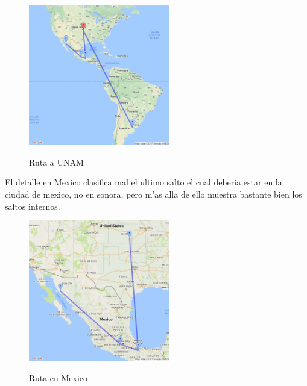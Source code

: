 \begin{figure}[H]
\centering
\caption{Ruta a UNAM}
\includegraphics[width=0.55\textwidth]{modules/unam_path_1}
 \label{fig:ruta_unam_1}
\end{figure}

El detalle en Mexico clasifica mal el ultimo salto el cual deberia estar en la ciudad de mexico, no en sonora, pero m'as alla de ello muestra bastante bien los saltos internos.
\begin{figure}[H]
\centering
\caption{Ruta en Mexico}
\includegraphics[width=0.55\textwidth]{modules/unam_path_2}
 \label{fig:ruta_unam_2}
\end{figure}
